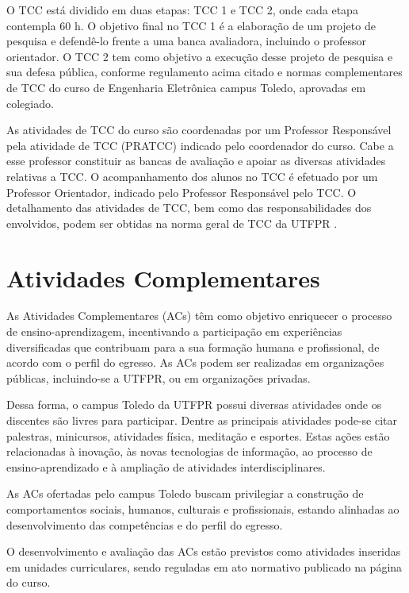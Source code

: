 O TCC está dividido em duas etapas: TCC 1 e TCC 2, onde cada etapa contempla 60 h. O objetivo final no TCC 1 é a elaboração de um projeto de pesquisa e defendê-lo frente a uma banca avaliadora, incluindo o professor orientador. O TCC 2 tem como objetivo a execução desse projeto de pesquisa e sua defesa pública, conforme regulamento acima citado e normas complementares de TCC do curso de Engenharia Eletrônica campus Toledo, aprovadas em colegiado.

As atividades de TCC do curso são coordenadas por um Professor Responsável pela atividade de TCC (PRATCC) indicado pelo coordenador do curso. Cabe a esse professor constituir as bancas de avaliação e apoiar as diversas atividades relativas a TCC. O acompanhamento dos alunos no TCC é efetuado por um Professor Orientador, indicado pelo Professor Responsável pelo TCC. O detalhamento das atividades de TCC, bem como das responsabilidades dos envolvidos, podem ser obtidas na norma geral de TCC da UTFPR \cite{cogep18}.

\section{Atividades Complementares}

As Atividades Complementares (ACs) têm como objetivo enriquecer o processo de ensino-aprendizagem, incentivando a participação em experiências diversificadas que contribuam para a sua formação humana e profissional, de acordo com o perfil do egresso. As ACs podem ser realizadas em organizações públicas, incluindo-se a UTFPR, ou em organizações privadas.


Dessa forma, o campus Toledo da UTFPR possui diversas atividades onde os discentes são livres para participar. Dentre as principais atividades pode-se citar palestras, minicursos, atividades física, meditação e esportes. Estas ações estão relacionadas à inovação, às novas tecnologias de informação, ao processo de ensino-aprendizado e à ampliação de atividades interdisciplinares. 

As ACs ofertadas pelo campus Toledo buscam privilegiar a construção de comportamentos sociais, humanos, culturais e profissionais, estando alinhadas ao desenvolvimento das competências e do perfil do egresso.

O desenvolvimento e avaliação das ACs estão previstos como atividades inseridas em unidades curriculares, sendo reguladas em ato normativo publicado na página do curso.

